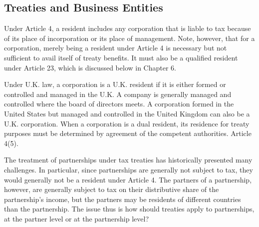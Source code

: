 % 

	\subsection{Treaties and Business Entities}

Under Article 4, a resident includes any corporation that is liable to tax because of its place of incorporation or its place of management.  Note, however, that for a corporation, merely being a resident under Article 4 is necessary but not sufficient to avail itself of treaty benefits.  It must also be a qualified resident under Article 23, which is discussed below in Chapter 6.  

Under U.K. law, a corporation is a U.K. resident if it is either formed or controlled and managed in the U.K.  A company is generally managed  and controlled where the board of directors meets.   A corporation formed in the United States but managed and controlled in the United Kingdom can also be a U.K. corporation.  When a corporation is a dual resident, its residence for treaty purposes must be determined by agreement of the competent authorities.  Article 4(5).  

The treatment of partnerships under tax treaties has historically presented many challenges.  In particular, since partnerships are generally not subject to tax, they would generally not be a resident under Article 4.  The partners of a partnership, however, are generally subject to tax on their distributive share of the partnership's income, but the partners may be residents of different countries than the partnership.  The issue thus is how should treaties apply to partnerships, at the partner level or at the partnership level?  



